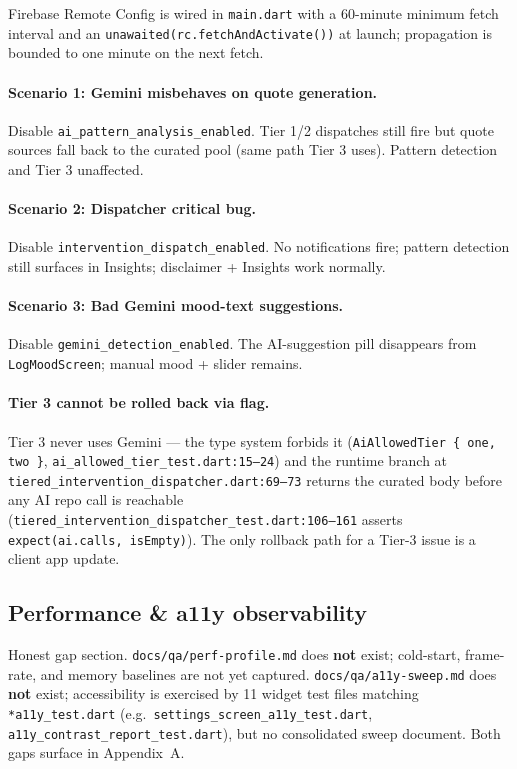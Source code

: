 \documentclass[11pt,a4paper]{article}
\begin{document}
Firebase Remote Config is wired in \texttt{main.dart} with a
60-minute minimum fetch interval and an \texttt{unawaited(rc.fetchAndActivate())}
at launch; propagation is bounded to one minute on the next fetch.

\paragraph{Scenario 1: Gemini misbehaves on quote generation.}
Disable \texttt{ai\_pattern\_analysis\_enabled}. Tier 1/2 dispatches still
fire but quote sources fall back to the curated pool (same path Tier 3
uses). Pattern detection and Tier 3 unaffected.

\paragraph{Scenario 2: Dispatcher critical bug.} Disable
\texttt{intervention\_dispatch\_enabled}. No notifications fire; pattern
detection still surfaces in Insights; disclaimer + Insights work normally.

\paragraph{Scenario 3: Bad Gemini mood-text suggestions.} Disable
\texttt{gemini\_detection\_enabled}. The AI-suggestion pill disappears
from \texttt{LogMoodScreen}; manual mood + slider remains.

\paragraph{Tier 3 cannot be rolled back via flag.} Tier 3 never uses
Gemini --- the type system forbids it (\texttt{AiAllowedTier \{ one, two
\}}, \texttt{ai\_allowed\_tier\_test.dart:15--24}) and the runtime branch
at \texttt{tiered\_intervention\_dispatcher.dart:69--73} returns the
curated body before any AI repo call is reachable
(\texttt{tiered\_intervention\_dispatcher\_test.dart:106--161} asserts
\texttt{expect(ai.calls, isEmpty)}). The only rollback path for a Tier-3
issue is a client app update.

\subsection{Performance \& a11y observability}\label{sec:perf-a11y}

Honest gap section. \texttt{docs/qa/perf-profile.md} does \textbf{not}
exist; cold-start, frame-rate, and memory baselines are not yet
captured. \texttt{docs/qa/a11y-sweep.md} does \textbf{not} exist;
accessibility is exercised by 11 widget test files matching
\texttt{*a11y\_test.dart} (e.g.\ \texttt{settings\_screen\_a11y\_test.dart},
\texttt{a11y\_contrast\_report\_test.dart}), but no consolidated sweep
document. Both gaps surface in Appendix~A.
\end{document}
